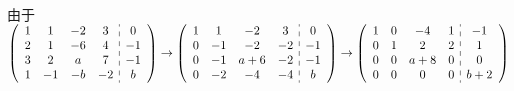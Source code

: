      \paragraph{} %
         由于 \( \left(\begin{array}{cccc:c}
                 1 & 1  & -2 & 3  & 0  \\
                 2 & 1  & -6 & 4  & -1 \\
                 3 & 2  & a  & 7  & -1 \\
                 1 & -1 & -b & -2 & b
             \end{array} \right)
         \to
         \left(\begin{array}{cccc:c}
                 1 & 1  & -2  & 3  & 0  \\
                 0 & -1 & -2  & -2 & -1 \\
                 0 & -1 & a+6 & -2 & -1 \\
                 0 & -2 & -4  & -4 & b
             \end{array} \right)
         \to
         \left(\begin{array}{cccc:c}
                 1 & 0 & -4  & 1 & -1  \\
                 0 & 1 & 2   & 2 & 1   \\
                 0 & 0 & a+8 & 0 & 0   \\
                 0 & 0 & 0   & 0 & b+2
             \end{array} \right) \)



